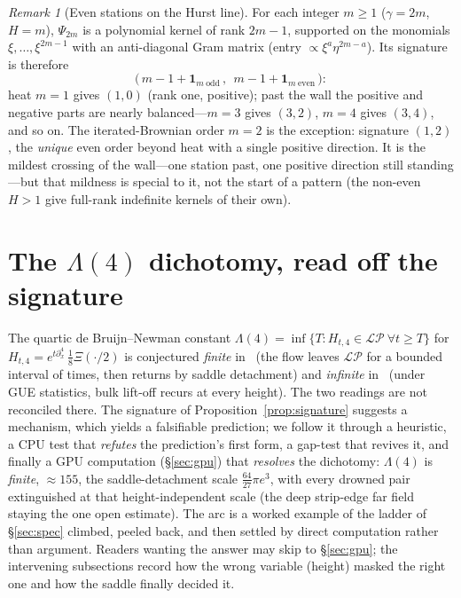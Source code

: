\documentclass[11pt,reqno]{amsart}
\theoremstyle{plain}
\theoremstyle{definition}
\theoremstyle{remark}
\newtheorem{remark}[theorem]{Remark}
\newcommand{\LP}{\mathcal{LP}}
\begin{document}
\begin{remark}[Even stations on the Hurst line]
For each integer $m\ge1$ ($\gamma=2m$, $H=m$), $\Psi_{2m}$ is a polynomial
kernel of rank $2m-1$, supported on the monomials $\xi,\dots,\xi^{2m-1}$
with an anti-diagonal Gram matrix (entry $\propto\xi^a\eta^{2m-a}$). Its
signature is therefore
\[
   \bigl(\,m-1+\mathbf 1_{m\ \mathrm{odd}}\,,\ \ m-1+\mathbf 1_{m\ \mathrm{even}}\,\bigr):
\]
heat $m=1$ gives $(1,0)$ (rank one, positive); past the wall the positive
and negative parts are nearly balanced---$m=3$ gives $(3,2)$, $m=4$ gives
$(3,4)$, and so on. The iterated-Brownian order $m=2$ is the exception:
signature $(1,2)$, the \emph{unique} even order beyond heat with a single
positive direction. It is the mildest crossing of the wall---one station
past, one positive direction still standing---but that mildness is special
to it, not the start of a pattern (the non-even $H>1$ give full-rank
indefinite kernels of their own).
\end{remark}

\section{The $\Lambda(4)$ dichotomy, read off the signature}
\label{sec:lambda4}

The quartic de Bruijn--Newman constant
$\Lambda(4)=\inf\{T:H_{t,4}\in\LP\ \forall t\ge T\}$ for
$H_{t,4}=e^{t\partial_x^4}\,\tfrac18\Xi(\cdot/2)$ is conjectured
\emph{finite} in~\cite{FontesIBM} (the flow leaves $\LP$ for a bounded
interval of times, then returns by saddle detachment) and
\emph{infinite} in~\cite{FontesRMT} (under GUE statistics, bulk
lift-off recurs at every height). The two readings are not reconciled
there. The signature of Proposition~\ref{prop:signature} suggests a
mechanism, which yields a falsifiable prediction; we follow it through a
heuristic, a CPU test that \emph{refutes} the prediction's first form, a
gap-test that revives it, and finally a GPU computation
(\S\ref{sec:gpu}) that \emph{resolves} the dichotomy: $\Lambda(4)$ is
\emph{finite}, $\approx155$, the saddle-detachment scale
$\tfrac{64}{27}\pi e^3$, with every drowned pair extinguished at that
height-independent scale (the deep strip-edge far field staying the one
open estimate). The arc is a worked example
of the ladder of \S\ref{sec:spec} climbed, peeled back, and then settled by
direct computation rather than argument. Readers wanting the answer may
skip to \S\ref{sec:gpu}; the intervening subsections record how the wrong
variable (height) masked the right one and how the saddle finally decided
it.
\end{document}
